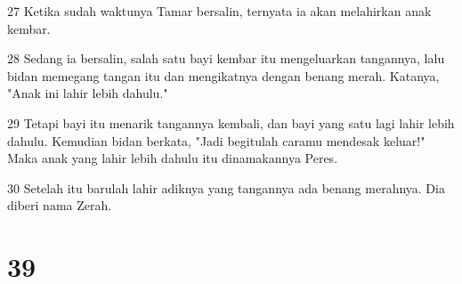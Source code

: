 \par 27 Ketika sudah waktunya Tamar bersalin, ternyata ia akan melahirkan anak kembar.
\par 28 Sedang ia bersalin, salah satu bayi kembar itu mengeluarkan tangannya, lalu bidan memegang tangan itu dan mengikatnya dengan benang merah. Katanya, "Anak ini lahir lebih dahulu."
\par 29 Tetapi bayi itu menarik tangannya kembali, dan bayi yang satu lagi lahir lebih dahulu. Kemudian bidan berkata, "Jadi begitulah caramu mendesak keluar!" Maka anak yang lahir lebih dahulu itu dinamakannya Peres.
\par 30 Setelah itu barulah lahir adiknya yang tangannya ada benang merahnya. Dia diberi nama Zerah.

\chapter{39}

